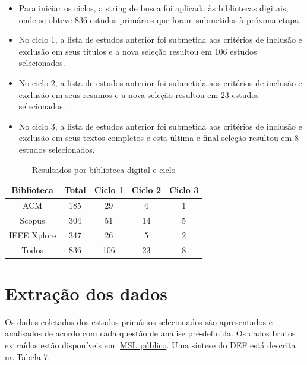 \documentclass[
	12pt,
	openright,
	twoside,
	a4paper,
	english,
	brazil
	]{abntex2}
\begin{document}
\begin{itemize}
  \item Para iniciar os ciclos, a string de busca foi aplicada às bibliotecas digitais, onde se obteve 836 estudos primários que foram submetidos à próxima etapa.
  \item No ciclo 1, a lista de estudos anterior foi submetida aos critérios de inclusão e exclusão em seus títulos e a nova seleção resultou em 106 estudos selecionados.
  \item No ciclo 2, a lista de estudos anterior foi submetida aos critérios de inclusão e exclusão em seus resumos e a nova seleção resultou em 23 estudos selecionados.
  \item No ciclo 3, a lista de estudos anterior foi submetida aos critérios de inclusão e exclusão em seus textos completos e esta última e final seleção resultou em 8 estudos selecionados.
\end{itemize}

\begin{table}[h!]
  \centering
  \caption{Resultados por biblioteca digital e ciclo}
  \begin{tabular}{|c|c|c|c|c|}
  \hline
  \textbf{Biblioteca} & \textbf{Total} & \textbf{Ciclo 1} & \textbf{Ciclo 2} & \textbf{Ciclo 3} \\ \hline
  ACM & 185 & 29 & 4 & 1 \\ \hline
  Scopus & 304 & 51 & 14 & 5 \\ \hline
  IEEE Xplore & 347 & 26 & 5 & 2 \\ \hline
  Todos & 836 & 106 & 23 & 8 \\ \hline
  \end{tabular}
\end{table}
  

\section{Extração dos dados}

Os dados coletados dos estudos primários selecionados são apresentados e analisados de acordo com cada questão de análise pré-definida. Os dados brutos extraídos estão disponíveis em: \href{https://docs.google.com/spreadsheets/d/1YY_yjyBefJ3ZmnEY38TM_LnZLoJcKhrw_q0BdEvqx2E/edit?gid=1276800509#gid=1276800509}{MSL público}. Uma síntese do DEF está descrita na Tabela 7.
\end{document}
